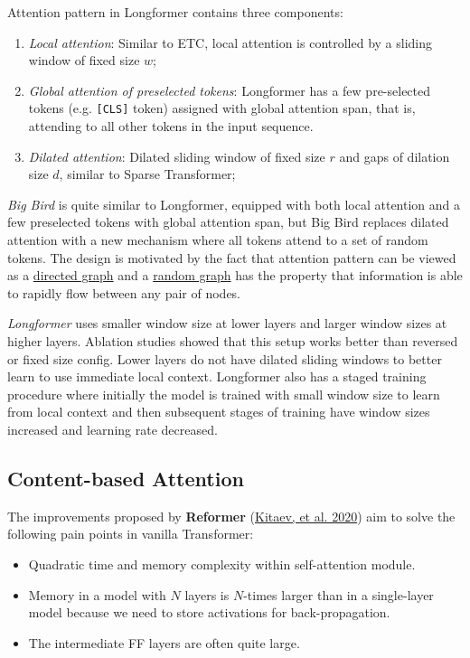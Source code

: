 \documentclass[12pt]{article}
\begin{document}
Attention pattern in Longformer contains three components:
\begin{enumerate}
    \item \emph{Local attention}: Similar to ETC, local attention is controlled by a sliding window of fixed size $w$;
    \item \emph{Global attention of preselected tokens}: Longformer has a few pre-selected tokens (e.g. \texttt{[CLS]} token) assigned with global attention span, that is, attending to all other tokens in the input sequence.
    \item \emph{Dilated attention}: Dilated sliding window of fixed size $r$ and gaps of dilation size $d$, similar to Sparse Transformer;
\end{enumerate}

\emph{Big Bird} is quite similar to Longformer, equipped with both local attention and a few preselected tokens with global attention span, but Big Bird replaces dilated attention with a new mechanism where all tokens attend to a set of random tokens. The design is motivated by the fact that attention pattern can be viewed as a \href{https://en.wikipedia.org/wiki/Directed_graph}{directed graph} and a \href{https://en.wikipedia.org/wiki/Random_graph}{random graph} has the property that information is able to rapidly flow between any pair of nodes.

\emph{Longformer} uses smaller window size at lower layers and larger window sizes at higher layers. Ablation studies showed that this setup works better than reversed or fixed size config. Lower layers do not have dilated sliding windows to better learn to use immediate local context. Longformer also has a staged training procedure where initially the model is trained with small window size to learn from local context and then subsequent stages of training have window sizes increased and learning rate decreased.

\subsection{Content-based Attention}
The improvements proposed by \textbf{Reformer} (\href{https://arxiv.org/abs/2001.04451}{Kitaev, et al. 2020}) aim to solve the following pain points in vanilla Transformer:
\begin{itemize}
    \item Quadratic time and memory complexity within self-attention module.
    \item Memory in a model with $N$ layers is $N$-times larger than in a single-layer model because we need to store activations for back-propagation.
    \item The intermediate FF layers are often quite large.
\end{itemize}
\end{document}
